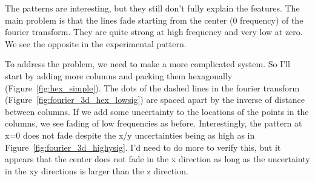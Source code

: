 \documentclass{article}
\begin{document}
The patterns are interesting, but they still don't fully explain the features.
The main problem is that the lines fade starting from the center (0 frequency)
of the fourier transform. They are quite strong at high frequency and very low
at zero. We see the opposite in the experimental pattern. 

To address the problem, we need to make a more complicated system. So I'll
start by adding more columns and packing them hexagonally
(Figure~\ref{fig:hex_simple}). The dots of the dashed lines in the fourier
transform (Figure~\ref{fig:fourier_3d_hex_lowsig}) are spaced apart by the
inverse of distance between columns. If we add some uncertainty to the 
locations of the points in the columns, we see fading of low frequencies
as before. Interestingly, the pattern at x=0 does not fade despite the 
x/y uncertainties being as high as in Figure~\ref{fig:fourier_3d_highysig}. 
I'd need to do more to verify this, but it appears that the center does
not fade in the x direction as long as the uncertainty in the xy directions
is larger than the z direction.
\end{document}
